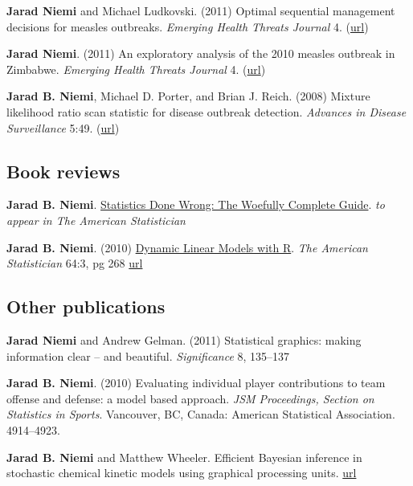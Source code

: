 \documentclass[overlapped,line]{res}
\newcommand{\sinceappt}{}
\begin{document}
\begin{resume}
{\bf Jarad Niemi} and Michael Ludkovski. (2011) Optimal sequential management decisions for measles outbreaks. \emph{Emerging Health Threats Journal} 4. (\href{http://dx.doi.org/10.3402/ehtj.v4i0.11907}{url})

{\bf Jarad Niemi}. (2011) An exploratory analysis of the 2010 measles outbreak in Zimbabwe. \emph{Emerging Health Threats Journal} 4. (\href{http://dx.doi.org/10.3402/ehtj.v4i0.11907}{url})

{\bf Jarad B. Niemi}, Michael D. Porter, and Brian J. Reich. (2008) Mixture likelihood ratio scan statistic for disease outbreak detection. \emph{Advances in Disease Surveillance} 5:49. (\href{http://faculty.washington.edu/lober/www.isdsjournal.org/htdocs/articles/3251.pdf}{url})



\subsection{\bf Book reviews} \vspace{-0.2in}

{\bf Jarad B. Niemi}. \underline{Statistics Done Wrong: The Woefully Complete Guide}. \emph{to appear in The American Statistician} 

{\bf Jarad B. Niemi}. (2010) \underline{Dynamic Linear Models with R}. \emph{The American Statistician} 64:3, pg 268 \href{http://dx.doi.org/10.1198/tast.2010.br643}{url}

\sinceappt


\subsection{\bf Other publications} \vspace{-0.2in}

{\bf Jarad Niemi} and Andrew Gelman. (2011) Statistical graphics: making information clear -- and beautiful. \emph{Significance} 8, 135--137

\sinceappt

{\bf Jarad B. Niemi}. (2010) Evaluating individual player contributions to team offense and defense: a model based approach. \emph{JSM Proceedings, Section on Statistics in Sports}. Vancouver, BC, Canada: American Statistical Association. 4914--4923.

{\bf Jarad B. Niemi} and Matthew Wheeler. Efficient Bayesian inference in stochastic chemical kinetic models using graphical processing units. \href{http://arxiv.org/abs/1101.4242}{url}


\end{resume}
\end{document}
